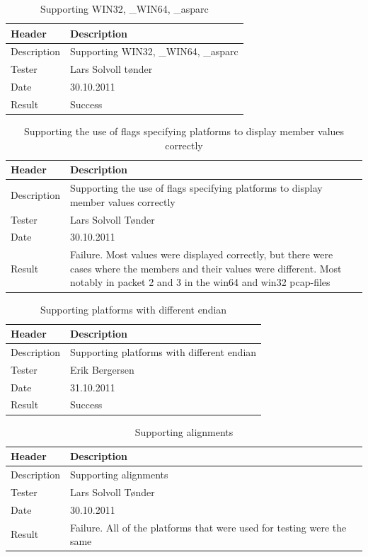 \begin{table}[!htb] \footnotesize \center
\caption{Supporting WIN32, \_WIN64, \_\gls{asparc} \label{tab:sp3TID19}}
\begin{tabular}{l l}
	\toprule
	Header & Description \\
	\midrule
	Description & Supporting WIN32, \_WIN64, \_\gls{asparc} \\
	Tester & Lars Solvoll tønder\\
	Date & 30.10.2011\\
	Result & Success \\
	\bottomrule
\end{tabular}
\end{table}

\begin{table}[!htb] \footnotesize \center
\caption{Supporting the use of flags specifying platforms to display \gls{member} values correctly \label{tab:sp3TID20}}
\begin{tabular}{l l}
	\toprule
	Header & Description \\
	\midrule
	Description & Supporting the use of flags specifying platforms to display \gls{member} values correctly \\
	Tester & Lars Solvoll Tønder\\
	Date & 30.10.2011\\
	Result & Failure. Most values were displayed correctly, but there were cases where the \glspl{member} and their values were different. Most notably in \gls{packet} 2 and 3 in the win64 and win32 \glspl{pcap-file}\\
	\bottomrule
\end{tabular}
\end{table}

\begin{table}[!htb] \footnotesize \center
\caption{Supporting platforms with different \gls{endian} \label{tab:sp3TID21}}
\begin{tabular}{l l}
	\toprule
	Header & Description \\
	\midrule
	Description & Supporting platforms with different \gls{endian} \\
	Tester & Erik Bergersen\\
	Date & 31.10.2011\\
	Result & Success\\
	\bottomrule
\end{tabular}
\end{table}

\begin{table}[!htb] \footnotesize \center
\caption{Supporting alignments \label{tab:sp3TID22}}
\begin{tabular}{l l}
	\toprule
	Header & Description \\
	\midrule
	Description & Supporting alignments \\
	Tester & Lars Solvoll Tønder\\
	Date & 30.10.2011\\
	Result & Failure. All of the platforms that were used for testing were the same\\
	\bottomrule
\end{tabular}
\end{table}

